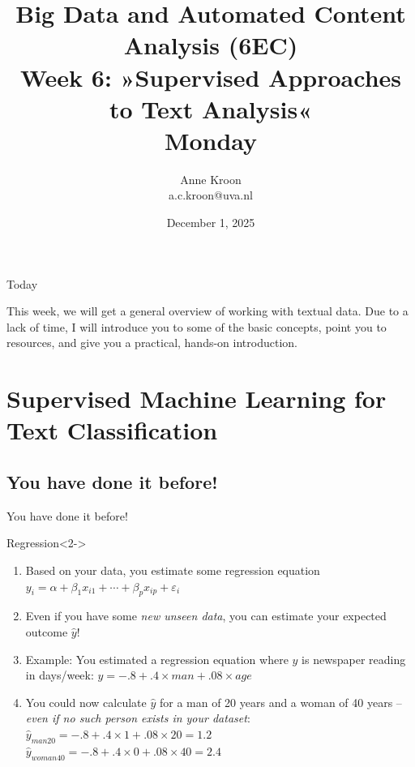 \documentclass[compress]{beamer}
\begin{document}
\title[Big Data and Automated Content Analysis]{\textbf{Big Data and Automated Content Analysis (6EC)} 
\\Week 6: »Supervised Approaches to Text Analysis«
\\Monday}
\author[Anne Kroon]{Anne Kroon\\ \footnotesize{a.c.kroon@uva.nl \\}}
\date{December 1, 2025}


\begin{frame}{}
	\titlepage
\end{frame}

\begin{frame}{Today}
	\tableofcontents
\end{frame}


\begin{frame}[standout]
This week, we will get a general overview of working with textual data. Due to a lack of time, I will introduce you to some of the basic concepts, point you to resources, and give you a practical, hands-on introduction. 
\end{frame}

\section{Supervised Machine Learning for Text Classification}

\subsection{You have done it before!}
\begin{frame}{You have done it before!}
	\begin{block}{Regression}<2->
		\begin{enumerate}
			\item<3-> Based on your data, you estimate some regression equation 	$y_i = \alpha + \beta_1 x_{i1} + \cdots + \beta_p x_{ip} + \varepsilon_i$
			\item<4-> Even if you have some \emph{new unseen data}, you can estimate your expected outcome $\hat{y}$!
			\item<5-> Example: You estimated a regression equation where $y$ is newspaper reading in days/week: $y = -.8 + .4 \times man + .08 \times age$
			\item<6-> You could now calculate $\hat{y}$ for a man of 20 years and a woman of 40 years -- \emph{even if no such person exists in your dataset}: \\
			$\hat{y}_{man20} = -.8 + .4 \times 1 + .08 \times 20 = 1.2$ \\
			$\hat{y}_{woman40} = -.8 + .4 \times 0 + .08 \times 40 = 2.4$
		\end{enumerate}
	\end{block}	
	
\end{frame}
\end{document}
